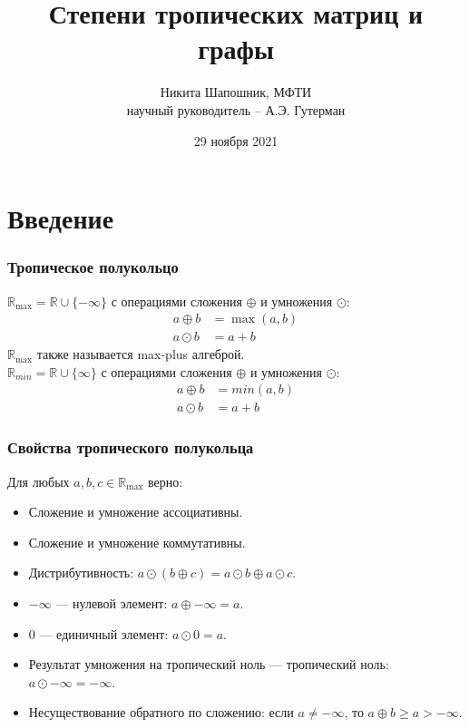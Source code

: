 \documentclass{beamer}
\title[Short title]{Степени тропических матриц и графы} %
\author{Никита Шапошник, МФТИ\\научный руководитель -- А.Э. Гутерман}
\date{29 ноября 2021} %
\begin{document}
\begin{frame}
\titlepage
\end{frame}

\section{Введение}

\begin{frame}
\frametitle{Тропическое полукольцо}
$\mathbb{R}_{\max} = \mathbb{R} \cup \{ -\infty\}$ с операциями сложения $\oplus$ и умножения $\odot$: \begin{align*}
            a \oplus b &= \max(a, b)\\
            a \odot b &= a + b
        \end{align*}
$\mathbb{R}_{\max}$ также называется max-plus алгеброй.\\

$\mathbb{R}_{min} = \mathbb{R} \cup \{ \infty\}$ с операциями сложения $\oplus$ и умножения $\odot$: \begin{align*}
            a \oplus b &= min(a, b)\\
            a \odot b &= a + b
        \end{align*}
\end{frame}


\begin{frame}
\frametitle{Свойства тропического полукольца} 
Для любых $a, b, c \in \mathbb{R}_{\max}$ верно:
\begin{itemize}
\item Сложение и умножение ассоциативны.
\item Сложение и умножение коммутативны.
\item Дистрибутивность: $a \odot (b \oplus c) = a \odot b \oplus a \odot c$.
\item $-\infty$ --- нулевой элемент: $a \oplus -\infty = a$.
\item $0$ --- единичный элемент: $a \odot 0= a$.
\item Результат умножения на тропический ноль --- тропический ноль: $a \odot -\infty = -\infty$.
\item Несуществование обратного по сложению: если $a \neq -\infty$, то $a \oplus b \ge a > -\infty$.
\end{itemize}
\end{frame}

\end{document}
